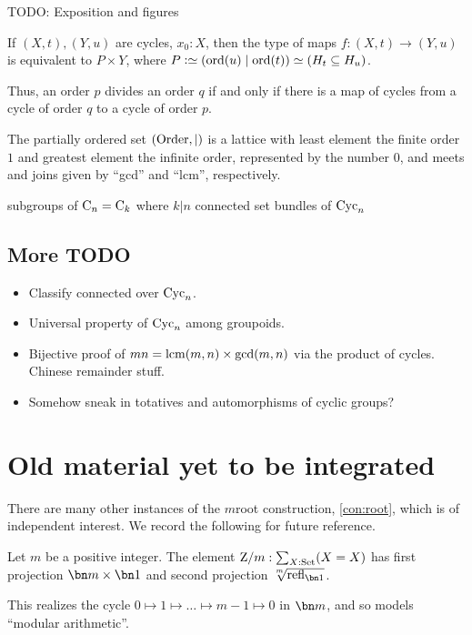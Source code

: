 {\color{casblue} TODO: Exposition and figures

\begin{theorem}
  If $(X,t),(Y,u)$ are cycles, $x_0:X$,
  then the type of maps $f : (X,t) \to (Y,u)$ is equivalent to $P\times Y$,
  where $P\defeq(\ord(u) \mid \ord(t)) \jdeq (H_t \subseteq H_u)$.
\end{theorem}

Thus, an order $p$ divides an order $q$ if and only if
there is a map of cycles from a cycle of order $q$
to a cycle of order $p$.
\begin{theorem}
  The partially ordered set $(\mathrm{Order},|)$ is a lattice
  with least element the finite order $1$
  and greatest element the infinite order, represented by the number $0$,
  and meets and joins given by “gcd” and “lcm”, respectively.
\end{theorem}

subgroups of $\mathrm{C}_n = \mathrm{C}_k$ where $k | n$
connected set bundles of $\mathrm{Cyc}_n$

\subsection{More TODO}

\begin{itemize}
\item Classify connected \coverings over $\mathrm{Cyc}_n$.
\item Universal property of $\mathrm{Cyc}_n$ among groupoids.
\item Bijective proof of $mn = \lcm(m,n)\times\gcd(m,n)$ via the product of cycles.
  Chinese remainder stuff.
\item Somehow sneak in totatives and automorphisms of cyclic groups?
\end{itemize}
}

\section{Old material yet to be integrated}
\label{sec:deckS1}

There are many other instances of the $m$\th root construction, \cref{con:root},
which is of independent interest.
We record the following for future reference.
\begin{definition} \label{def:Zetmodm}
Let $m$ be a positive integer.
The element $\mathrm{Z}/m:\sum_{X:\mathrm{Set}}(X=X)$ has first projection $\bn m\times\bn 1$ and
second projection $\sqrt[\uproot{2}m]{\refl{\bn 1}}$.
\end{definition}
\noindent
This realizes the cycle $0\mapsto1\mapsto\dots\mapsto m-1\mapsto 0$ in $\bn m$,
and so models ``modular arithmetic''.

